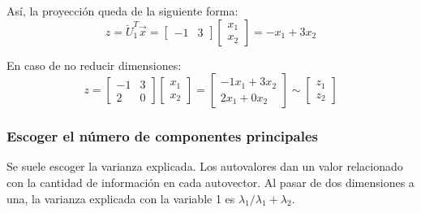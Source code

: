 Así, la proyección queda de la siguiente forma:
$$z = \breve{U}_1^T \vec{x} =  \begin{bmatrix}
-1 & 3
\end{bmatrix} \begin{bmatrix}
x_1 \\ x_2
\end{bmatrix} = -x_1 + 3 x_2$$

En caso de no reducir dimensiones:
$$z = \begin{bmatrix}
-1 & 3 \\ 2 & 0
\end{bmatrix} \begin{bmatrix}
x_1 \\ x_2
\end{bmatrix} = \begin{bmatrix}
-1 x_1 + 3 x_2 \\
2 x_1 + 0 x_2
\end{bmatrix} \sim \begin{bmatrix}
z_1 \\ z_2
\end{bmatrix}$$

\subsubsection{Escoger el número de componentes principales}
Se suele escoger la varianza explicada. Los autovalores dan un valor relacionado con la cantidad de información en cada autovector. Al pasar de dos dimensiones a una, la varianza explicada con la variable 1 es $\lambda_1 / \lambda_1 + \lambda_2$.